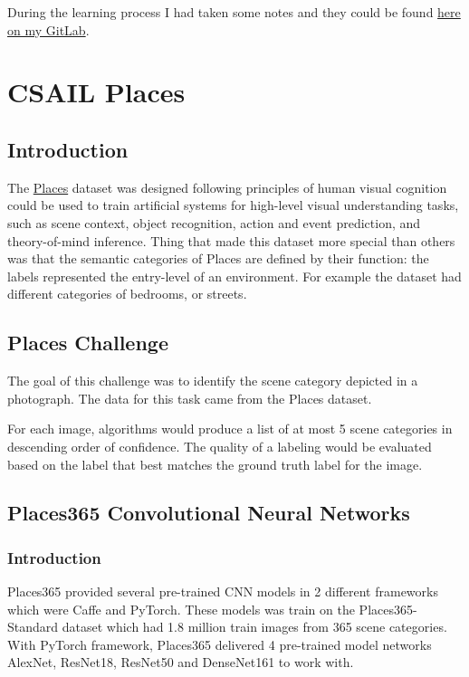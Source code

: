 During the learning process I had taken some notes and they could be found \href{https://gitlab.com/tlvu2697/epfl--ee559--deep-learning}{here on my GitLab}.

\section{CSAIL Places}
\subsection{Introduction}
The \href{http://places2.csail.mit.edu/}{Places} dataset was designed following principles of human visual cognition could be used to train artificial systems for high-level visual understanding tasks, such as scene context, object recognition, action and event prediction, and theory-of-mind inference. Thing that made this dataset more special than others was that the semantic categories of Places are defined by their function: the labels represented the entry-level of an environment. For example the dataset had different categories of bedrooms, or streets.

\subsection{Places Challenge}
The goal of this challenge was to identify the scene category depicted in a photograph. The data for this task came from the Places dataset.

For each image, algorithms would produce a list of at most 5 scene categories in descending order of confidence. The quality of a labeling would be evaluated based on the label that best matches the ground truth label for the image.

\subsection{Places365 Convolutional Neural Networks}
\subsubsection{Introduction}
Places365\cite{places365} provided several pre-trained CNN models in 2 different frameworks which were Caffe\cite{caffe} and PyTorch\cite{pytorch}. These models was train on the Places365-Standard dataset which had 1.8 million train images from 365 scene categories. With PyTorch framework, Places365 delivered 4 pre-trained model networks AlexNet\cite{alexnet}, ResNet18\cite{resnet}, ResNet50 and DenseNet161\cite{densenet} to work with.

